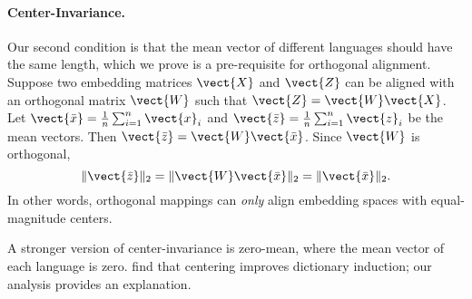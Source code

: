 \paragraph{Center-Invariance.}
%
Our second condition is that the mean vector of different languages should have
the same length, which we prove is a pre-requisite for orthogonal
alignment.
%
Suppose two embedding matrices $\vect{X}$ and $\vect{Z}$ can be aligned with an
orthogonal matrix $\vect{W}$ such that $\vect{Z} = \vect{W} \vect{X}$.
%
Let $\vect{\bar{x}} = \frac{1}{n} \sum_{i=1}^n \vect{x}_i$ and $\vect{\bar{z}}
= \frac{1}{n} \sum_{i=1}^n \vect{z}_i$ be the mean vectors.
%
Then $\vect{\bar{z}} = \vect{W} \vect{\bar{x}}$.  Since $\vect{W}$ is 
orthogonal, 
\begin{equation*}
  \| \vect{\bar{z}} \|_2 = \| \vect{W} \vect{\bar{x}} \|_2 = \| \vect{\bar{x}}\|_2.
\end{equation*}
In other words, orthogonal mappings can \emph{only} align embedding spaces
with equal-magnitude centers.

A stronger version of center-invariance is zero-mean, where the mean vector of
each language is zero.
 find that centering improves dictionary induction; our
analysis provides an explanation.
